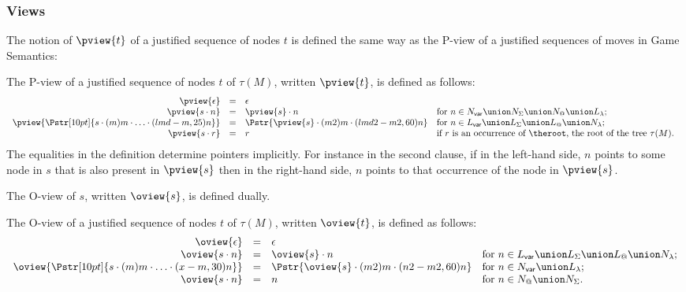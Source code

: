 \subsubsection{Views}
The notion of  $\pview{t}$ of a justified sequence
of nodes $t$ is defined the same way as the P-view of a justified
sequences of moves in Game Semantics:

\begin{definition}
The P-view of a justified sequence of nodes $t$ of $\tau(M)$, written $\pview{t}$, is defined as follows:
$$\begin{array}{rcll}
 \pview{\epsilon} &=&  \epsilon \\
 \pview{s \cdot n }  &=&  \pview{s} \cdot n
    & \mbox{for $n \in N_{\sf var} \union N_\Sigma \union N_@ \union L_\lambda$;}
    \\
 \pview{\Pstr[10pt]{ s \cdot (m){m} \cdot \ldots \cdot (lmd-m,25){n}}} &=&
        \Pstr{ \pview{s} \cdot (m2){m} \cdot (lmd2-m2,60){n} }
    & \mbox{for $n \in L_{\sf var} \union L_\Sigma \union L_@ \union N_\lambda$;}
    \\
 \pview{s \cdot r }  &=&  r
    & \mbox{if $r$ is an occurrence of $\theroot$, the root of the tree $\tau(M)$. }
\end{array}$$
The equalities in the definition determine pointers implicitly. For
instance in the second clause, if in the left-hand side, $n$ points
to some node in $s$  that is also present in $\pview{s}$ then in the
right-hand side, $n$ points to that occurrence of the node in
$\pview{s}$.
\end{definition}

The O-view of $s$, written $\oview{s}$, is defined dually.
\begin{definition}
\label{dfn:oview} The O-view of a justified sequence of nodes $t$ of
$\tau(M)$, written $\oview{t}$, is defined as follows:
$$\begin{array}{rcll}
 \oview{\epsilon} &=&  \epsilon \\
 \oview{s \cdot n }  &=&  \oview{s} \cdot n
    & \mbox{for $n \in L_{\sf var} \union L_\Sigma \union L_@ \union N_\lambda$;}
    \\
 \oview{\Pstr[10pt]{s \cdot (m){m} \cdot \ldots \cdot (x-m,30){n}}} &=&
    \Pstr{ \oview{s} \cdot (m2){m} \cdot (n2-m2,60){n} }
    & \mbox{for $n \in N_{\sf var} \union L_\lambda$;}
    \\
 \oview{s \cdot n }  &=&  n
    & \mbox{for $n \in N_@ \union N_\Sigma$.}
\end{array}$$
\end{definition}

